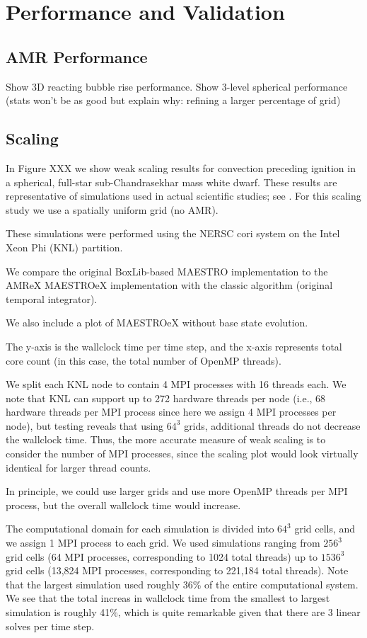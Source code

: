 \section{Performance and Validation}

\subsection{AMR Performance}
Show 3D reacting bubble rise performance.
Show 3-level spherical performance (stats won't be as good but explain why: refining a larger percentage of grid)

\subsection{Scaling}
In Figure XXX we show weak scaling results for convection preceding ignition in a spherical, full-star sub-Chandrasekhar mass white dwarf.
These results are representative of simulations used in actual scientific studies; see \cite{MAESTRO_convection,MAESTRO_AMR}.
For this scaling study we use a spatially uniform grid (no AMR).


These simulations were performed using the NERSC cori system on the Intel Xeon Phi (KNL) partition.

We compare the original BoxLib-based MAESTRO implementation to the AMReX MAESTROeX implementation with the classic algorithm (original temporal integrator).

We also include a plot of MAESTROeX without base state evolution.

The y-axis is the wallclock time per time step, and the x-axis represents total core count (in this case, the total number of OpenMP threads).

We split each KNL node to contain 4 MPI processes with 16 threads each.  We note that KNL can support up to 272 hardware threads per node (i.e., 68 hardware threads per MPI process since here we assign 4 MPI processes per node), but testing reveals that using $64^3$ grids, additional threads do not decrease the wallclock time.  Thus, the more accurate measure of weak scaling is to consider the number of MPI processes, since the scaling plot would look virtually identical for larger thread counts.


In principle, we could use larger grids and use more OpenMP threads per MPI process, but the overall wallclock time would increase.

The computational domain for each simulation is divided into $64^3$ grid cells, and we assign 1 MPI process to each grid.
We used simulations ranging from $256^3$ grid cells (64 MPI processes, corresponding to 1024 total threads) up to $1536^3$ grid cells (13,824 MPI processes, corresponding to 221,184 total threads).
Note that the largest simulation used roughly 36\% of the entire computational system.
We see that the total increas in wallclock time from the smallest to largest simulation is roughly 41\%, which is quite remarkable given that there are 3 linear solves per time step.

